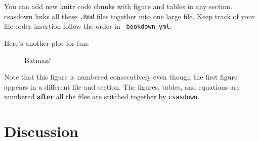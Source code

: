 \documentclass[12pt]{article}\usepackage[]{graphicx}\usepackage[]{color}
\begin{document}
You can add new knitr code chunks with figure and tables in any section. csasdown links all these \texttt{.Rmd} files together into one large file. Keep track of your file order insertion follow the order in \texttt{\_bookdown.yml}.

Here's another plot for fun:




\begin{figure}[htb]

{\centering {} 

}

\caption{Batman!}\label{fig:batman}
\end{figure}
Note that this figure is numbered consecutively even though the first figure appears in a different file and section. The figures, tables, and equations are numbered \textbf{after} all the files are stitched together by \texttt{csasdown}.

\section{Discussion}\label{discussion}
\end{document}
